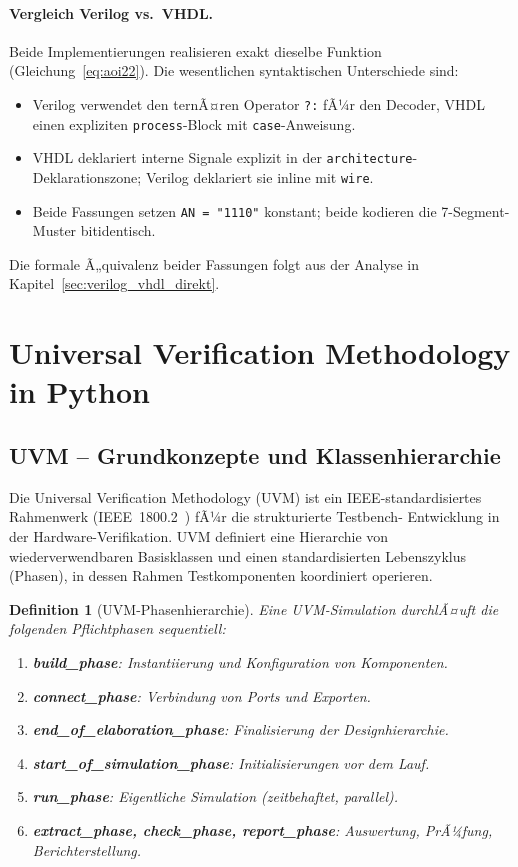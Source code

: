 ﻿\documentclass[12pt,a4paper]{report}
\newtheorem{definition}{Definition}[section]
\begin{document}
\paragraph{Vergleich Verilog vs.\ VHDL.}
Beide Implementierungen realisieren exakt dieselbe Funktion (Gleichung~\ref{eq:aoi22}).
Die wesentlichen syntaktischen Unterschiede sind:
\begin{itemize}
    \item Verilog verwendet den ternÃ¤ren Operator \texttt{?:} fÃ¼r den Decoder,
          VHDL einen expliziten \texttt{process}-Block mit \texttt{case}-Anweisung.
    \item VHDL deklariert interne Signale explizit in der \texttt{architecture}-
          Deklarationszone; Verilog deklariert sie inline mit \texttt{wire}.
    \item Beide Fassungen setzen \texttt{AN = "1110"} konstant; beide kodieren
          die 7-Segment-Muster bitidentisch.
\end{itemize}
Die formale Ã„quivalenz beider Fassungen folgt aus der Analyse in
Kapitel~\ref{sec:verilog_vhdl_direkt}.

\section{Universal Verification Methodology in Python}
\label{subsec:pyuvm_framework}

\subsection{UVM -- Grundkonzepte und Klassen\-hierarchie}

Die Universal Verification Methodology (UVM) ist ein IEEE-standardisiertes
Rahmenwerk (IEEE~1800.2~\cite{uvm2020}) fÃ¼r die strukturierte Testbench-
Entwicklung in der Hardware-Verifikation. UVM definiert eine Hierarchie von
wiederverwendbaren Basisklassen und einen standardisierten Lebenszyklus
(Phasen), in dessen Rahmen Testkomponenten koordiniert operieren.

\begin{definition}[UVM-Phasenhierarchie]
Eine UVM-Simulation durchlÃ¤uft die folgenden Pflichtphasen sequentiell:
\begin{enumerate}
    \item \textbf{build\_phase}: Instantiierung und Konfiguration von Komponenten.
    \item \textbf{connect\_phase}: Verbindung von Ports und Exporten.
    \item \textbf{end\_of\_elaboration\_phase}: Finalisierung der Designhierarchie.
    \item \textbf{start\_of\_simulation\_phase}: Initialisierungen vor dem Lauf.
    \item \textbf{run\_phase}: Eigentliche Simulation (zeitbehaftet, parallel).
    \item \textbf{extract\_phase, check\_phase, report\_phase}: Auswertung, PrÃ¼fung, Berichterstellung.
\end{enumerate}
\end{definition}
\end{document}
